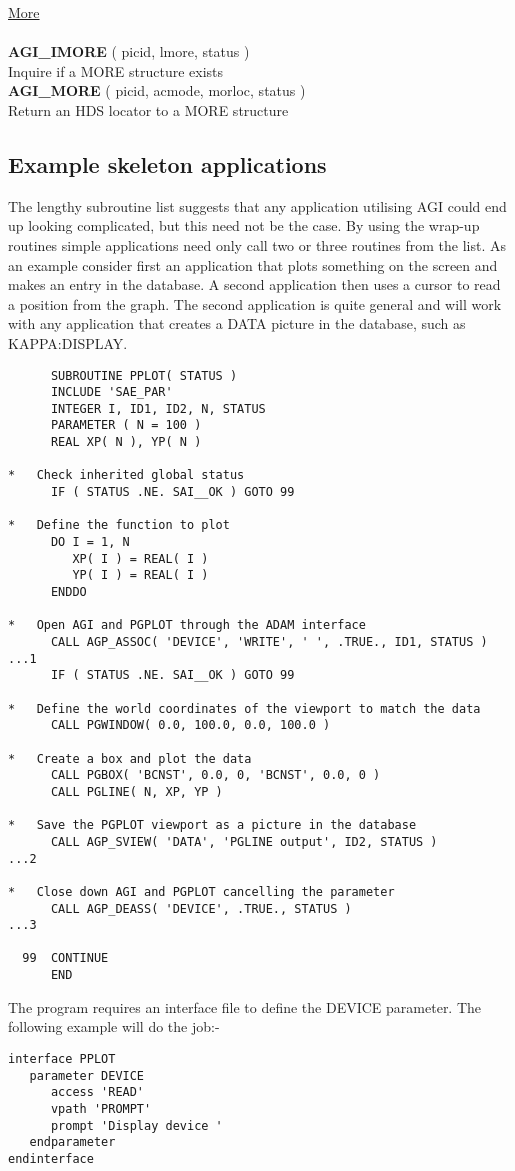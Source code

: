 \begin{tabbing}
\underline{More}\\ \\
{\bf AGI\_IMORE} \> ( picid, lmore, status )\\
                 \> Inquire if a MORE structure exists\\[1ex]
{\bf AGI\_MORE}  \> ( picid, acmode, morloc, status )\\
                 \> Return an HDS locator to a MORE structure\\[2ex]
\end{tabbing}

\subsection{Example skeleton applications}\label{exam}

The lengthy subroutine list suggests that any application utilising
AGI could end up looking complicated, but this need not be the case.
By using the wrap-up routines simple applications need only call two or
three routines from the list. As an example consider first an application
that plots something on the screen and makes an entry in the database. A
second application then uses a cursor to read a position from the graph.
The second application is quite general and will work with any application
that creates a DATA picture in the database, such as KAPPA:DISPLAY.
\begin{verbatim}
      SUBROUTINE PPLOT( STATUS )
      INCLUDE 'SAE_PAR'
      INTEGER I, ID1, ID2, N, STATUS
      PARAMETER ( N = 100 )
      REAL XP( N ), YP( N )

*   Check inherited global status
      IF ( STATUS .NE. SAI__OK ) GOTO 99

*   Define the function to plot
      DO I = 1, N
         XP( I ) = REAL( I )
         YP( I ) = REAL( I )
      ENDDO

*   Open AGI and PGPLOT through the ADAM interface
      CALL AGP_ASSOC( 'DEVICE', 'WRITE', ' ', .TRUE., ID1, STATUS )     ...1
      IF ( STATUS .NE. SAI__OK ) GOTO 99

*   Define the world coordinates of the viewport to match the data
      CALL PGWINDOW( 0.0, 100.0, 0.0, 100.0 )

*   Create a box and plot the data
      CALL PGBOX( 'BCNST', 0.0, 0, 'BCNST', 0.0, 0 )
      CALL PGLINE( N, XP, YP )

*   Save the PGPLOT viewport as a picture in the database
      CALL AGP_SVIEW( 'DATA', 'PGLINE output', ID2, STATUS )            ...2

*   Close down AGI and PGPLOT cancelling the parameter
      CALL AGP_DEASS( 'DEVICE', .TRUE., STATUS )                        ...3

  99  CONTINUE
      END
\end{verbatim}
The program requires an interface file to define the DEVICE parameter.
The following example will do the job:-
\newpage %
\begin{verbatim}
interface PPLOT
   parameter DEVICE
      access 'READ'
      vpath 'PROMPT'
      prompt 'Display device '
   endparameter
endinterface
\end{verbatim}

